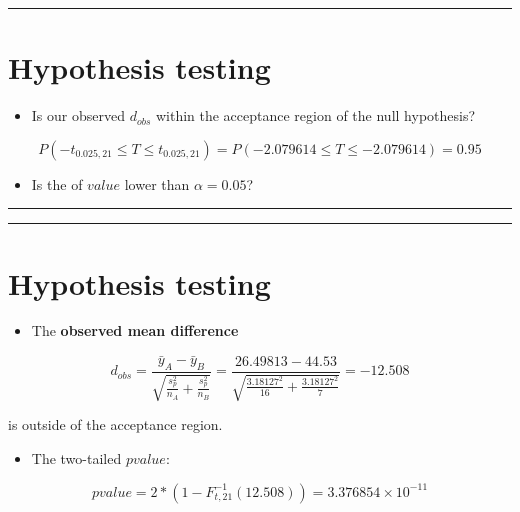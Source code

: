 \documentclass[
]{book}
\providecommand{\tightlist}{%
  \setlength{\itemsep}{0pt}\setlength{\parskip}{0pt}}
\begin{document}
\begin{center}\rule{0.5\linewidth}{0.5pt}\end{center}

\hypertarget{hypothesis-testing-2}{%
\section{Hypothesis testing}\label{hypothesis-testing-2}}

\begin{itemize}
\tightlist
\item
  Is our observed \(d_{obs}\) within the acceptance region of the null hypothesis?
\end{itemize}

\[P(-t_{0.025, 21} \leq T \leq t_{0.025, 21})=P(-2.079614 \leq T \leq -2.079614)=0.95\]

\begin{itemize}
\tightlist
\item
  Is the of \(value\) lower than \(\alpha=0.05\)?
\end{itemize}

\begin{center}\rule{0.5\linewidth}{0.5pt}\end{center}

\begin{center}\rule{0.5\linewidth}{0.5pt}\end{center}

\hypertarget{hypothesis-testing-3}{%
\section{Hypothesis testing}\label{hypothesis-testing-3}}

\begin{itemize}
\tightlist
\item
  The \textbf{observed mean difference}
\end{itemize}

\[d_{obs}=\frac{\bar{y}_A-\bar{y}_B }{\sqrt{\frac{s^2_p}{n_A}+\frac{s^2_p}{n_B}}}=\frac{26.49813-44.53}{\sqrt{\frac{3.18127^2}{16}+\frac{3.18127^2}{7}}}=-12.508\]

is outside of the acceptance region.

\begin{itemize}
\tightlist
\item
  The two-tailed \(pvalue\):
\end{itemize}

\[pvalue=2*(1-F^{-1}_{t,21}(12.508))=3.376854 \times 10^{-11}\]
\end{document}
